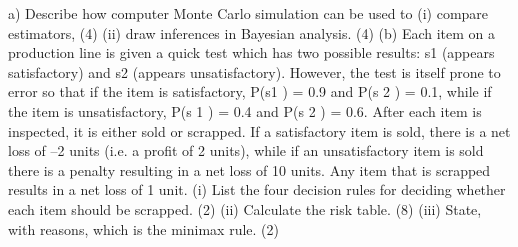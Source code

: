 a) Describe how computer Monte Carlo simulation can be used to
(i) compare estimators,
(4)
(ii) draw inferences in Bayesian analysis.
(4)
(b) Each item on a production line is given a quick test which has two possible
results: s1
(appears satisfactory) and s2
(appears unsatisfactory). However, the
test is itself prone to error so that if the item is satisfactory, P(s1
) = 0.9 and
P(s
2
) = 0.1, while if the item is unsatisfactory, P(s
1
) = 0.4 and P(s
2
) = 0.6.
After each item is inspected, it is either sold or scrapped. If a satisfactory item
is sold, there is a net loss of –2 units (i.e. a profit of 2 units), while if an
unsatisfactory item is sold there is a penalty resulting in a net loss of 10 units.
Any item that is scrapped results in a net loss of 1 unit.
(i) List the four decision rules for deciding whether each item should be
scrapped.
(2)
(ii) Calculate the risk table.
(8)
(iii) State, with reasons, which is the minimax rule.
(2)
